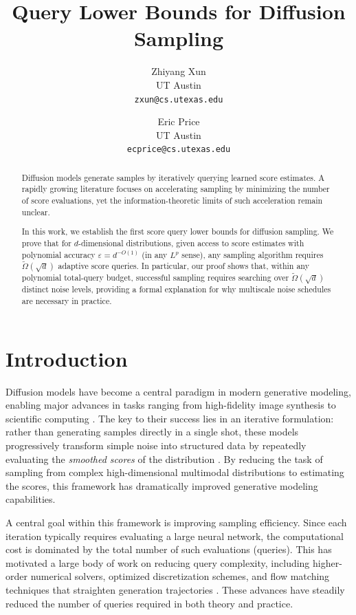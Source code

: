 \documentclass[11pt,letterpaper]{article}
\author{Zhiyang Xun \\ UT Austin \\ \texttt{zxun@cs.utexas.edu} \and Eric Price \\ UT Austin \\ \texttt{ecprice@cs.utexas.edu}}
\title{Query Lower Bounds for Diffusion Sampling}
\newcommand{\1}{\mathbbm{1}}
\begin{document}
\maketitle
\begin{abstract}
  Diffusion models generate samples by iteratively querying learned score estimates. A rapidly growing literature focuses on accelerating sampling by minimizing the number of score evaluations, yet the information-theoretic limits of such acceleration remain unclear.

  In this work, we establish the first score query lower bounds for diffusion sampling. We prove that for $d$-dimensional distributions, given access to score estimates with polynomial accuracy $\varepsilon=d^{-O(1)}$ (in any $L^p$ sense), any sampling algorithm requires $\widetilde{\Omega}(\sqrt{d})$ adaptive score queries. In particular, our proof shows that, within any polynomial total-query budget, successful sampling requires searching over $\widetilde{\Omega}(\sqrt{d})$ distinct noise levels, providing a formal explanation for why multiscale noise schedules are necessary in practice.
\end{abstract}



\section{Introduction}
Diffusion models have become a central paradigm in modern generative modeling, enabling major advances in tasks ranging from high-fidelity image synthesis to scientific computing \citep{sohl2015diffusion,ho2020ddpm,song2021score_sde,nichol2021improved,karras2022edm}.
The key to their success lies in an iterative formulation: rather than generating samples directly in a single shot, these models progressively transform simple noise into structured data by repeatedly evaluating the \textit{smoothed scores} of the distribution \citep{song2019sgm,song2021score_sde}.
By reducing the task of sampling from complex high-dimensional multimodal distributions to estimating the scores, this framework has dramatically improved generative modeling capabilities.

A central goal within this framework is improving sampling efficiency.
Since each iteration typically requires evaluating a large neural network, the computational cost is dominated by the total number of such evaluations (queries).
This has motivated a large body of work on reducing query complexity, including higher-order numerical solvers, optimized discretization schemes, and flow matching techniques that straighten generation trajectories  \citep{lu2022dpmsolver,lu2022dpmsolverpp,liu2022pndm,zhang2022deis,zhao2023unipc,karras2022edm,lipman2022flowmatching,liu2022rectified}.
These advances have steadily reduced the number of queries required in both theory and practice.
\end{document}
